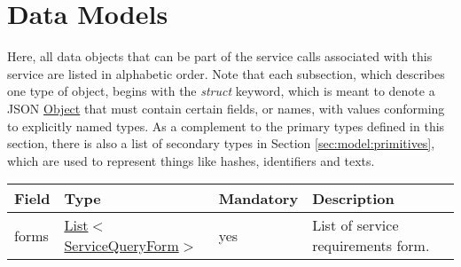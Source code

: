 \documentclass[a4paper]{arrowhead}
\newcommand{\pref}[1]{{\textcolor{ArrowheadGrey}{\hyperref[sec:model:primitives:#1]{#1}}}}
\begin{document}
\newpage

\section{Data Models}
\label{sec:model}

Here, all data objects that can be part of the service calls associated with this service are listed in alphabetic order.
Note that each subsection, which describes one type of object, begins with the \textit{struct} keyword, which is meant to denote a JSON \pref{Object} that must contain certain fields, or names, with values conforming to explicitly named types.
As a complement to the primary types defined in this section, there is also a list of secondary types in Section \ref{sec:model:primitives}, which are used to represent things like hashes, identifiers and texts.

\label{sec:model:ServiceQueryFormList}

\begin{table}[ht!]
\begin{tabularx}{\textwidth}{| p{5cm} | p{4cm} | p{2cm} | X |} \hline
\rowcolor{gray!33} Field & Type & Mandatory & Description \\ \hline
forms &\pref{List}$<$\hyperref[sec:model:ServiceQueryForm]{ServiceQueryForm}$>$ & yes & List of service requirements form. \\ \hline
\end{tabularx}
\end{table}

\label{sec:model:ServiceQueryForm}
\end{document}
